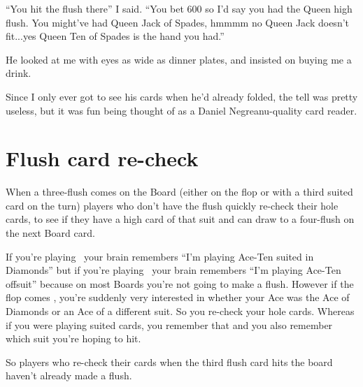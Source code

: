 ``You hit the flush there'' I said. ``You bet 600 so I'd
say you had the Queen high flush. You might've had Queen Jack of Spades,
hmmmm no Queen Jack doesn't fit...yes Queen Ten of Spades is the hand
you had.''

He looked at me with eyes as wide as dinner plates, and insisted on buying
me a drink.

Since I only ever got to see his cards when he'd already folded, the tell
was pretty useless, but it was fun being thought of as a Daniel
Negreanu-quality card reader.


\section{Flush card re-check}

When a three-flush comes on the Board (either on the flop or with
a third suited card on the turn) players who don't have the flush
quickly re-check their hole cards, to see if they have a high card
of that suit and can draw to a four-flush on the next Board card.

If you're playing \Ad\tend\ your brain remembers ``I'm playing Ace-Ten
suited in Diamonds'' but if you're playing \Ad\tens\ your brain remembers
``I'm playing Ace-Ten offsuit'' because on most Boards you're not going to
make a flush. However if the flop comes \Kd\eigd\sevd, you're suddenly
very interested in whether your Ace was the Ace of Diamonds or an Ace of
a different suit. So you re-check your hole cards. Whereas if you were
playing suited cards, you remember that and you also remember which suit
you're hoping to hit.

So players who re-check their cards when the third flush card hits the
board haven't already made a flush.
